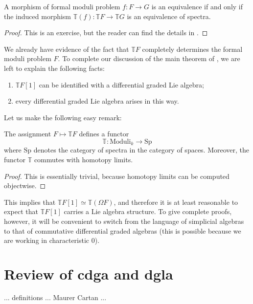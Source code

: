 \begin{refsection}
\begin{prop}
A morphism of formal moduli problem $f \colon F \to G$ is an equivalence if and only if the induced morphism $\mathbb T(f) \colon \mathbb T F \to \mathbb T G$ is an equivalence of spectra.
\end{prop}

\begin{proof}
This is an exercise, but the reader can find the details in \cite[Proposition 1.2.10]{dagx}.
\end{proof}

We already have evidence of the fact that $\mathbb T F$ completely determines the formal moduli problem $F$. To complete our discussion of the main theorem of \cite{dagx}, we are left to explain the following facts:
\begin{enumerate}
\item $\mathbb T F[1]$ can be identified with a differential graded Lie algebra;
\item every differential graded Lie algebra arises in this way.
\end{enumerate}

Let us make the following easy remark:

\begin{lemma}
The assignment $F \mapsto \mathbb T F$ defines a functor
\[
\mathbb T \colon \mathrm{Moduli}_k \to \mathrm{Sp}
\]
where $\mathrm{Sp}$ denotes the category of spectra in the category of spaces. Moreover, the functor $\mathbb T$ commutes with homotopy limits.
\end{lemma}

\begin{proof}
This is essentially trivial, because homotopy limits can be computed objectwise.
\end{proof}

This implies that $\mathbb T F[1] \simeq \mathbb T(\Omega F)$, and therefore it is at least reasonable to expect that $\mathbb T F[1]$ carries a Lie algebra structure. To give complete proofs, however, it will be convenient to switch from the language of simplicial algebras to that of commutative differential graded algebras (this is possible because we are working in characteristic $0$).

\section{Review of cdga and dgla}

... definitions ... Maurer Cartan ...


\end{refsection}
